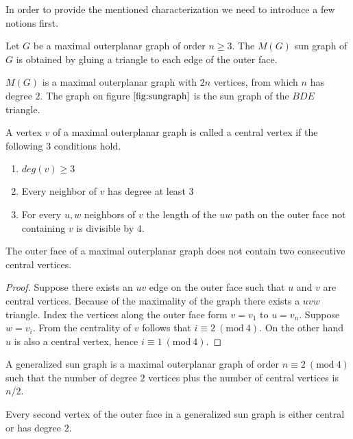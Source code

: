 In order to provide the mentioned characterization we need to introduce a few
notions first.
\begin{definition}
  Let $G$ be a maximal outerplanar graph of order $n \ge 3$. The $M(G)$ sun graph
  of $G$ is obtained by gluing a triangle to each edge of the outer face.
\end{definition}
\begin{remark}
  $M(G)$ is a maximal outerplanar graph with $2n$ vertices, from which $n$ has
  degree $2$. The graph on figure $\ref{fig:sungraph}$ is the sun graph of
  the $BDE$ triangle.
\end{remark}
\begin{definition}
  A vertex $v$ of a maximal outerplanar graph is called a central vertex if the
  following $3$ conditions hold.
  \begin{enumerate}
    \item $deg(v) \ge 3$
    \item Every neighbor of $v$ has degree at least $3$
    \item For every $u, w$ neighbors of $v$ the length of the $uw$ path on the
    outer face not containing $v$ is divisible by $4$.
  \end{enumerate}
\end{definition}
\begin{claim}
  The outer face of a maximal outerplanar graph does not contain two consecutive
  central vertices.
\end{claim}
\begin{proof}
  Suppose there exists an $uv$ edge on the outer face such that $u$ and $v$ are
  central vertices. Because of the maximality of the graph there exists a $uvw$
  triangle. Index the vertices along the outer face form $v = v_1$ to $u = v_{n}$.
  Suppose $w = v_i$. From the centrality of $v$ follows that $i \equiv 2\
  (\textrm{mod}\ 4)$. On the other hand $u$ is also a central vertex, hence
  $i \equiv 1\ (\textrm{mod}\ 4)$.
\end{proof}
\begin{definition}
  A generalized sun graph is a maximal outerplanar graph of order
  $n \equiv 2\ (\textrm{mod}\ 4)$ such that the number of
  degree $2$ vertices plus the number of central vertices is $n/2$.
\end{definition}
\begin{remark}
  Every second vertex of the outer face in a generalized sun graph is either
  central or has degree $2$.
\end{remark}

